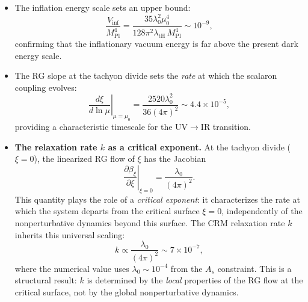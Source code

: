\documentclass[aps,prd,twocolumn,superscriptaddress,nofootinbib]{revtex4-2}
\begin{document}
\begin{itemize}
\item The inflation energy scale sets an upper bound:
\begin{equation}
\frac{V_\mathrm{inf}}{M_\mathrm{Pl}^4} = \frac{35\lambda_0^2\mu_0^4}{128\pi^2\lambda_\mathrm{tH}\,M_\mathrm{Pl}^4} \sim 10^{-9},
\end{equation}
confirming that the inflationary vacuum energy is far above the present dark energy scale.

\item The RG slope at the tachyon divide sets the \textit{rate} at which the scalaron coupling evolves:
\begin{equation}
\left.\frac{d\xi}{d\ln\mu}\right|_{\mu=\mu_0} = \frac{2520\lambda_0^2}{36(4\pi)^2} \sim 4.4 \times 10^{-5},
\end{equation}
providing a characteristic timescale for the UV$\to$IR transition.

\item \textbf{The relaxation rate $k$ as a critical exponent.} At the tachyon divide ($\xi = 0$), the linearized RG flow of $\xi$ has the Jacobian
\begin{equation}
\left.\frac{\partial\beta_\xi}{\partial\xi}\right|_{\xi=0} = \frac{\lambda_0}{(4\pi)^2}.
\end{equation}
This quantity plays the role of a \textit{critical exponent}: it characterizes the rate at which the system departs from the critical surface $\xi = 0$, independently of the nonperturbative dynamics beyond this surface. The CRM relaxation rate $k$ inherits this universal scaling:
\begin{equation}
k \propto \frac{\lambda_0}{(4\pi)^2} \sim 7 \times 10^{-7},
\label{eq:k-critical}
\end{equation}
where the numerical value uses $\lambda_0 \sim 10^{-4}$ from the $A_s$ constraint. This is a structural result: $k$ is determined by the \textit{local} properties of the RG flow at the critical surface, not by the global nonperturbative dynamics.


\end{itemize}
\end{document}
